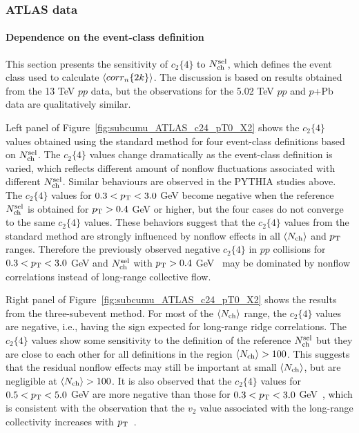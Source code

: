 \subsubsection{ATLAS data}

\paragraph{Dependence on the event-class definition}
\label{sec:dependence_on_the_event_class_definition}

This section presents the sensitivity of $c_2\{4\}$ to $N_\text{ch}^\text{sel}$, which defines the event class used to calculate $\left\langle corr_n\{2k\}\right\rangle$. The discussion is based on results obtained from the 13 TeV $pp$ data, but the observations for the 5.02 TeV $pp$ and $p$+Pb data are qualitatively similar.

Left panel of Figure~\ref{fig:subcumu_ATLAS_c24_pT0_X2} shows the $c_2\{4\}$ values obtained using the standard method for four event-class definitions based on $N_\text{ch}^\text{sel}$. The $c_2\{4\}$ values change dramatically as the event-class definition is varied, which reflects different amount of nonflow fluctuations associated with different $N_\text{ch}^\text{sel}$. Similar behaviours are observed in the PYTHIA studies above. The $c_2\{4\}$ values for $0.3<p_\text{T}<3.0$ GeV become negative when the reference $N_\text{ch}^\text{sel}$ is obtained for $p_\text{T}>0.4$ GeV or higher, but the four cases do not converge to the same $c_2\{4\}$ values. These behaviors suggest that the $c_2\{4\}$ values from the standard method are strongly influenced by nonflow effects in all $\left\langle N_\text{ch}\right\rangle$ and $p_\text{T}$ ranges. Therefore the previously observed negative $c_2\{4\}$ in $pp$ collisions for $0.3<p_\text{T}<3.0$ GeV and $N_\text{ch}^\text{sel}$ with $p_\text{T}>0.4$ GeV~\cite{Khachatryan:2016txc} may be dominated by nonflow correlations instead of long-range collective flow.

Right panel of Figure~\ref{fig:subcumu_ATLAS_c24_pT0_X2} shows the results from the three-subevent method. For most of the $\left\langle N_\text{ch}\right\rangle$ range, the $c_2\{4\}$ values are negative, i.e., having the sign expected for long-range ridge correlations. The $c_2\{4\}$ values show some sensitivity to the definition of the reference $N_\text{ch}^\text{sel}$ but they are close to each other for all definitions in the region $\left\langle N_\text{ch}\right\rangle>100$. This suggests that the residual nonflow effects may still be important at small $\left\langle N_\text{ch}\right\rangle$, but are negligible at $\left\langle N_\text{ch}\right\rangle>100$. It is also observed that the $c_2\{4\}$ values for $0.5<p_\text{T}<5.0$ GeV are more negative than those for $0.3<p_\text{T}<3.0$ GeV~\cite{Aaboud:2017blb}, which is consistent with the observation that the $v_2$ value associated with the long-range collectivity increases with $p_\text{T}$~\cite{Aad:2014lta, Aaboud:2016yar}.

